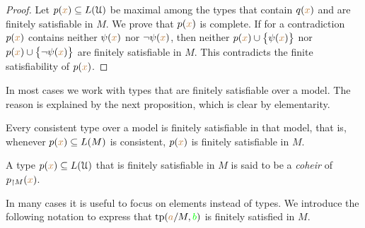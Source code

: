 \documentclass[creche.tex]{subfiles}
\begin{document}
\begin{proof} 
Let $p({\color{brown} x})\subseteq L(\EuScript U)$ be maximal among the types that contain $q({\color{brown} x})$ and are finitely satisfiable in $M$.
We prove that $p({\color{brown} x})$ is complete.
If for a contradiction $p({\color{brown} x})$ contains neither $\psi({\color{brown} x})$ nor $\neg\psi({\color{brown} x})$, then  neither $p({\color{brown} x})\cup\big\{\psi({\color{brown} x})\big\}$ nor $p({\color{brown} x})\cup\big\{\neg\psi({\color{brown} x})\big\}$ are finitely satisfiable in $M$.
This contradicts the finite satisfiability of $p({\color{brown} x})$.
\end{proof}

In most cases we work with types that are finitely satisfiable over a model. The reason is explained by the next proposition, which is clear by elementarity.

\begin{proposition}\label{prop_coher_over_model}
    Every consistent type over a model is finitely satisfiable in that model, that is, whenever $p({\color{brown} x})\subseteq L(M)$ is consistent, $p({\color{brown} x})$ is finitely satisfiable in $M$. \QED
\end{proposition}

\begin{definition}\label{def_choeir_uno} A type $p({\color{brown} x}) \subseteq L(\EuScript U)$ that is finitely satisfiable in $M$ is said to be a \emph{coheir\/} of $p_{\restriction M}({\color{brown} x})$. \QED
\end{definition}


In many cases it is useful to focus on elements instead of types.
We introduce the following notation to express that ${\rm tp}({\color{brown} a}/M,{\color{green} b})$ is finitely satisfied in $M$.
\end{document}
